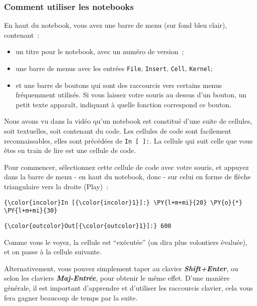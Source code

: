     \hypertarget{comment-utiliser-les-notebooks}{%
\subsubsection{Comment utiliser les
notebooks}\label{comment-utiliser-les-notebooks}}

    En haut du notebook, vous avez une barre de menu (sur fond bleu clair),
contenant~:

\begin{itemize}
\tightlist
\item
  un titre pour le notebook, avec un numéro de version~;
\item
  une barre de menus avec les entrées \texttt{File}, \texttt{Insert},
  \texttt{Cell}, \texttt{Kernel};
\item
  et une barre de boutons qui sont des raccourcis vers certains menus
  fréquemment utilisés. Si vous laissez votre souris au dessus d'un
  bouton, un petit texte apparaît, indiquant à quelle fonction
  correspond ce bouton.
\end{itemize}

Nous avons vu dans la vidéo qu'un notebook est constitué d'une suite de
cellules, soit textuelles, soit contenant du code. Les cellules de code
sont facilement reconnaissables, elles sont précédées de
\texttt{In\ {[}\ {]}:}. La cellule qui suit celle que vous êtes en train
de lire est une cellule de code.

Pour commencer, sélectionnez cette cellule de code avec votre souris, et
appuyez dans la barre de menu - en haut du notebook, donc - sur celui en
forme de flèche triangulaire vers la droite (Play)~: 

    \begin{Verbatim}[commandchars=\\\{\}]
{\color{incolor}In [{\color{incolor}1}]:} \PY{l+m+mi}{20} \PY{o}{*} \PY{l+m+mi}{30}
\end{Verbatim}


\begin{Verbatim}[commandchars=\\\{\}]
{\color{outcolor}Out[{\color{outcolor}1}]:} 600
\end{Verbatim}
            
    Comme vous le voyez, la cellule est ``exécutée'' (on dira plus
volontiers évaluée), et on passe à la cellule suivante.

Alternativement, vous pouvez simplement taper au clavier
\textbf{\emph{Shift+Enter}}, ou selon les claviers
\textbf{\emph{Maj-Entrée}}, pour obtenir le même effet. D'une manière
générale, il est important d'apprendre et d'utiliser les raccourcis
clavier, cela vous fera gagner beaucoup de temps par la suite.

